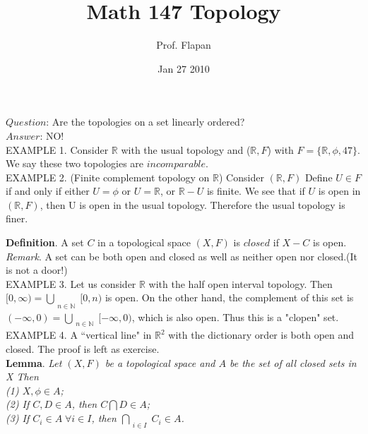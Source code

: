 \documentclass{article}
\title{Math 147 Topology}
\author{Prof. Flapan}
\date{Jan 27 2010}
\begin{document}
\maketitle
  \noindent $Question$: Are the topologies on a set linearly ordered?
  \\ $Answer$: NO! \vspace{4mm}
  \\  EXAMPLE 1. \quad  Consider $\mathbb{R}$ with the usual topology and
  ($\mathbb{R}, F$) with $F = \lbrace \mathbb{R},\phi,47 \rbrace$.
  We say these two topologies are $incomparable$.\vspace{4mm}
  \\EXAMPLE 2. (Finite complement topology on $\mathbb{R}$)  \quad Consider $(\mathbb{R},F)$ Define $U \in F$ if and
  only if either $U=\phi$ or $U=\mathbb{R}$, or $\mathbb{R}-U$ is
  finite. We see that if $U$ is open in $(\mathbb{R},F)$, then U is
  open in the usual topology. Therefore the usual topology is finer.\vspace{4mm}

  \noindent \textbf{Definition}. \quad A set $C$ in a topological space
  $(X,F)$ is $closed$ if $X-C$ is open.
  \\ \noindent \textit{Remark}. \quad A set can be both open and closed as well as neither open nor closed.(It is not a door!)\vspace{4mm}
  \\EXAMPLE 3. \quad Let us consider $\mathbb{R}$ with the half open
  interval topology. Then $\lbrack 0,\infty)=\bigcup _{\substack{\\n \in \mathbb{N}}} \lbrack 0,n)$ is
  open. On the other hand, the complement of this set is
  $(-\infty,0) = \bigcup_{\substack{n \in \mathbb{N}}} \lbrack
  -\infty,0)$, which is also open. Thus this is a "clopen" set.\vspace{4mm}
  \\EXAMPLE 4. \quad A ``vertical line" in $\mathbb{R}^{2}$ with the dictionary order
  is both open and closed. The proof is left as exercise.\vspace{4mm}
  \\ \noindent \textbf{Lemma}. \quad \textit{Let $(X,F)$ be a topological space and
  $A$
  be the set of all closed sets in X Then \vspace{2mm}
  \\ \indent (1) $X,\phi \in A$;\vspace{1mm}
  \\ \indent (2) If $C,D \in A$, then $C \bigcap D \in A$;\vspace{1mm}
  \\ \indent (3) If $C_i \in A \; \forall i \in I$, then $\bigcap_{\substack{i
  \in I}}C_i \in A$.}\vspace{2mm}
\end{document}
